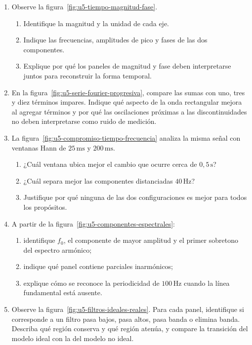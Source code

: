 \begin{enumerate}[label=\textbf{L\arabic*.},leftmargin=*]
    \item Observe la figura~\ref{fig:u5-tiempo-magnitud-fase}.
    \begin{enumerate}[label=\alph*)]
        \item Identifique la magnitud y la unidad de cada eje.
        \item Indique las frecuencias, amplitudes de pico y fases de las dos
        componentes.
        \item Explique por qué los paneles de magnitud y fase deben
        interpretarse juntos para reconstruir la forma temporal.
    \end{enumerate}

    \item En la figura~\ref{fig:u5-serie-fourier-progresiva}, compare las sumas
    con uno, tres y diez términos impares. Indique qué aspecto de la onda
    rectangular mejora al agregar términos y por qué las oscilaciones próximas
    a las discontinuidades no deben interpretarse como ruido de medición.

    \item La figura~\ref{fig:u5-compromiso-tiempo-frecuencia} analiza la misma
    señal con ventanas Hann de \(25\,\text{ms}\) y \(200\,\text{ms}\).
    \begin{enumerate}[label=\alph*)]
        \item ¿Cuál ventana ubica mejor el cambio que ocurre cerca de
        \(0{,}5\,\text{s}\)?
        \item ¿Cuál separa mejor las componentes distanciadas
        \(40\,\text{Hz}\)?
        \item Justifique por qué ninguna de las dos configuraciones es mejor
        para todos los propósitos.
    \end{enumerate}

    \item A partir de la figura~\ref{fig:u5-componentes-espectrales}:
    \begin{enumerate}[label=\alph*)]
        \item identifique \(f_0\), el componente de mayor amplitud y el primer
        sobretono del espectro armónico;
        \item indique qué panel contiene parciales inarmónicos;
        \item explique cómo se reconoce la periodicidad de
        \(100\,\text{Hz}\) cuando la línea fundamental está ausente.
    \end{enumerate}

    \item Observe la figura~\ref{fig:u5-filtros-ideales-reales}. Para cada
    panel, identifique si corresponde a un filtro pasa bajos, pasa altos, pasa
    banda o elimina banda. Describa qué región conserva y qué región atenúa, y
    compare la transición del modelo ideal con la del modelo no ideal.
\end{enumerate}

